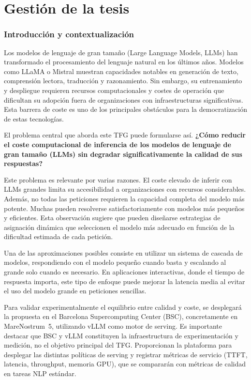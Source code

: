 \part{Gestión de la tesis}
\label{part:gestion-tesis}

\section{Introducción y contextualización}

Los modelos de lenguaje de gran tamaño (Large Language Models, LLMs) han transformado el procesamiento del lenguaje natural en los últimos años. Modelos como LLaMA o Mistral muestran capacidades notables en generación de texto, comprensión lectora, traducción y razonamiento. Sin embargo, su entrenamiento y despliegue requieren recursos computacionales y costes de operación que dificultan su adopción fuera de organizaciones con infraestructuras significativas. Esta barrera de coste es uno de los principales obstáculos para la democratización de estas tecnologías.

El problema central que aborda este TFG puede formularse así. \textbf{¿Cómo reducir el coste computacional de inferencia de los modelos de lenguaje de gran tamaño (LLMs) sin degradar significativamente la calidad de sus respuestas?}

Este problema es relevante por varias razones. El coste elevado de inferir con LLMs grandes limita su accesibilidad a organizaciones con recursos considerables. Además, no todas las peticiones requieren la capacidad completa del modelo más potente. Muchas pueden resolverse satisfactoriamente con modelos más pequeños y eficientes. Esta observación sugiere que pueden diseñarse estrategias de asignación dinámica que seleccionen el modelo más adecuado en función de la dificultad estimada de cada petición.

Una de las aproximaciones posibles consiste en utilizar un sistema de cascada de modelos, respondiendo con el modelo pequeño cuando basta y escalando al grande solo cuando es necesario. En aplicaciones interactivas, donde el tiempo de respuesta importa, este tipo de enfoque puede mejorar la latencia media al evitar el uso del modelo grande en peticiones sencillas.

Para validar experimentalmente el equilibrio entre calidad y coste, se desplegará la propuesta en el Barcelona Supercomputing Center (BSC), concretamente en MareNostrum~5, utilizando vLLM como motor de serving. Es importante destacar que BSC y vLLM constituyen la infraestructura de experimentación y medición, no el objetivo principal del TFG. Proporcionan la plataforma para desplegar las distintas políticas de serving y registrar métricas de servicio (TTFT, latencia, throughput, memoria GPU), que se compararán con métricas de calidad en tareas NLP estándar.

